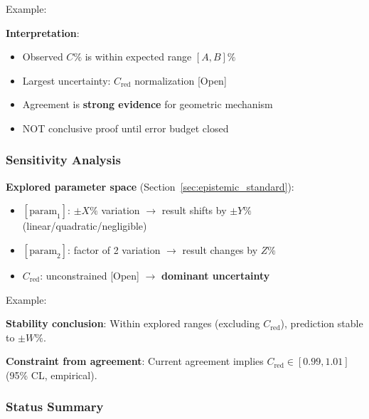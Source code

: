 Example:

\textbf{Interpretation}:
\begin{itemize}
\item Observed $C\%$ is within expected range $[A, B]\%$
\item Largest uncertainty: $C_{\mathrm{red}}$ normalization [Open]
\item Agreement is \textbf{strong evidence} for geometric mechanism
\item NOT conclusive proof until error budget closed
\end{itemize}


\subsubsection{Sensitivity Analysis}

\textbf{Explored parameter space} (Section~\ref{sec:epistemic_standard}):

\begin{itemize}
\item $[\text{param}_1]$: $\pm X\%$ variation
  $\to$ result shifts by $\pm Y\%$ (linear/quadratic/negligible)
  
\item $[\text{param}_2]$: factor of 2 variation
  $\to$ result changes by $Z\%$
  
\item $C_{\mathrm{red}}$: unconstrained [Open]
  $\to$ \textbf{dominant uncertainty}
\end{itemize}

Example:

\textbf{Stability conclusion}:
Within explored ranges (excluding $C_{\mathrm{red}}$), prediction stable to $\pm W\%$.

\textbf{Constraint from agreement}:
Current agreement implies $C_{\mathrm{red}} \in [0.99, 1.01]$ (95\% CL, empirical).


\subsubsection{Status Summary}

